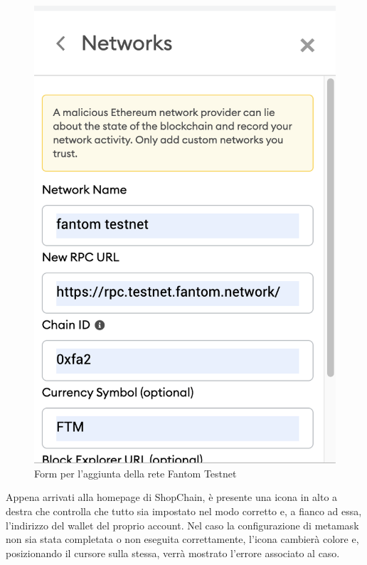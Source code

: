 \begin{figure}[H]
    \centering
    \includegraphics[scale=0.6]{immagini/setmeta2.png}
    \caption{Form per l'aggiunta della rete Fantom Testnet}
\end{figure} 

Appena arrivati alla homepage di ShopChain, è presente una icona in alto a destra che controlla che tutto sia impostato nel modo corretto e, a fianco ad essa, l'indirizzo del wallet del proprio account.
Nel caso la configurazione di metamask non sia stata completata o non eseguita correttamente, l'icona cambierà colore e, posizionando il cursore sulla stessa, verrà mostrato l'errore associato al caso.


